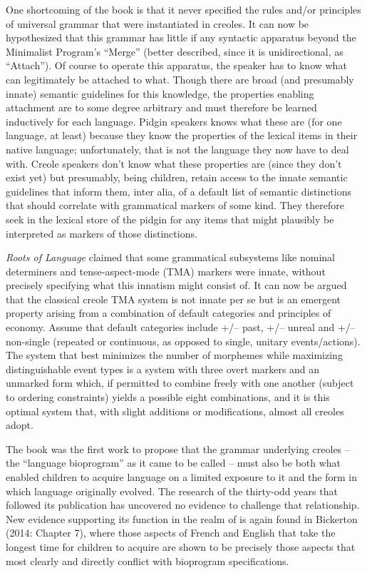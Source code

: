 \documentclass[letterpaper]{article}
\begin{document}
One shortcoming of the book is that it never specified the rules and/or principles of universal grammar that were instantiated in creoles.  It can now be hypothesized that this grammar has little if any syntactic apparatus beyond the Minimalist Program’s “Merge” (better described, since it is unidirectional, as “Attach”).  Of course to operate this apparatus, the speaker has to know what can legitimately be attached to what.  Though there are broad (and presumably innate) semantic guidelines for this knowledge, the properties enabling attachment are to some degree arbitrary and must therefore be learned inductively for each language.  Pidgin speakers knows what these are (for one language, at least) because they know the properties of the lexical items in their native language; unfortunately, that is not the language they now have to deal with.  Creole speakers don’t know what these properties are (since they don’t exist yet) but presumably, being children, retain access to the innate semantic guidelines that inform them, inter alia, of a default list of semantic distinctions that should correlate with grammatical markers of some kind. They therefore seek in the lexical store of the pidgin for any items that might plausibly be interpreted as markers of those distinctions.

\textit{Roots of Language }claimed that some grammatical subsystems like nominal determiners and tense-aspect-mode (TMA) markers were innate, without precisely specifying what this innatism might consist of.  It can now be argued that the classical creole TMA system is not innate per se but is an emergent property arising from a combination of default categories and principles of economy.  Assume that default categories include +/– past, +/– unreal and +/– non-single (repeated or continuous, as opposed to single, unitary events/actions).  The system that best minimizes the number of morphemes while maximizing distinguishable event types is a system with three overt markers and an unmarked form which, if permitted to combine freely with one another (subject to ordering constraints) yields a possible eight combinations, and it is this optimal system that, with slight additions or modifications, almost all creoles adopt.

The book was the first work to propose that the grammar underlying creoles – the “language bioprogram” as it came to be called – must also be both what enabled children to acquire language on a limited exposure to it and the form in which language originally evolved.  The research of the thirty-odd years that followed its publication has uncovered no evidence to challenge that relationship.  New evidence supporting its function in the realm of is again found in Bickerton (2014: Chapter 7), where those aspects of French and English that take the longest time for children to acquire are shown to be precisely those aspects that most clearly and directly conflict with bioprogram specifications.
\end{document}
